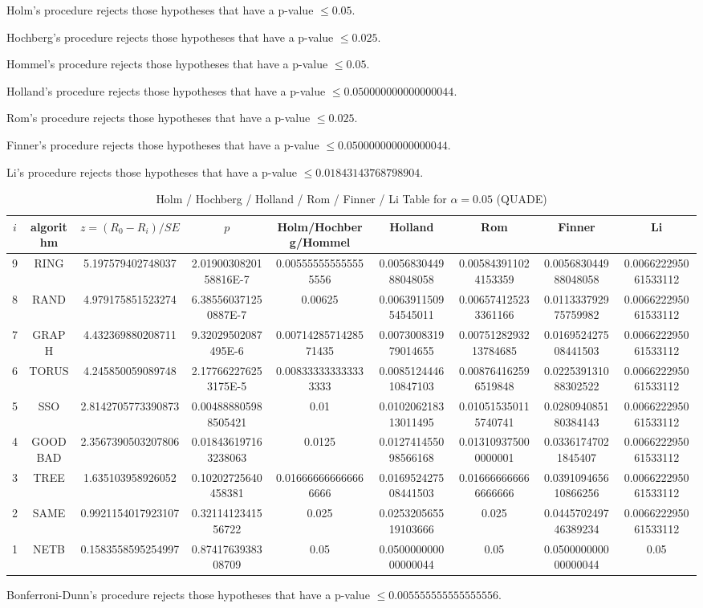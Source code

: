 \documentclass[a4paper,10pt]{article}
\begin{document}
\begin{landscape}
Holm's procedure rejects those hypotheses that have a p-value $\le0.05$.


Hochberg's procedure rejects those hypotheses that have a p-value $\le0.025$.


Hommel's procedure rejects those hypotheses that have a p-value $\le0.05$.


Holland's procedure rejects those hypotheses that have a p-value $\le0.050000000000000044$.


Rom's procedure rejects those hypotheses that have a p-value $\le0.025$.


Finner's procedure rejects those hypotheses that have a p-value $\le0.050000000000000044$.


Li's procedure rejects those hypotheses that have a p-value $\le0.01843143768798904$.



\newpage

\begin{table}[!htp]
\centering\scriptsize
\caption{Holm / Hochberg / Holland / Rom / Finner / Li Table for $\alpha=0.05$ (QUADE)}
\begin{tabular}{ccccccccc}
$i$&algorithm&$z=(R_0 - R_i)/SE$&$p$&Holm/Hochberg/Hommel&Holland&Rom&Finner&Li\\
\hline
9& RING&5.197579402748037&2.0190030820158816E-7&0.005555555555555556&0.005683044988048058&0.005843911024153359&0.005683044988048058&0.006622295061533112\\
8& RAND&4.979175851523274&6.385560371250887E-7&0.00625&0.006391150954545011&0.006574125233361166&0.011333792975759982&0.006622295061533112\\
7& GRAPH&4.432369880208711&9.32029502087495E-6&0.0071428571428571435&0.007300831979014655&0.0075128293213784685&0.016952427508441503&0.006622295061533112\\
6& TORUS&4.245850059089748&2.177662276253175E-5&0.008333333333333333&0.008512444610847103&0.008764162596519848&0.022539131088302522&0.006622295061533112\\
5& SSO&2.8142705773390873&0.004888805988505421&0.01&0.010206218313011495&0.010515350115740741&0.028094085180384143&0.006622295061533112\\
4& GOODBAD&2.3567390503207806&0.018436197163238063&0.0125&0.012741455098566168&0.013109375000000001&0.03361747021845407&0.006622295061533112\\
3& TREE&1.635103958926052&0.10202725640458381&0.016666666666666666&0.016952427508441503&0.016666666666666666&0.039109465610866256&0.006622295061533112\\
2& SAME&0.9921154017923107&0.3211412341556722&0.025&0.025320565519103666&0.025&0.044570249746389234&0.006622295061533112\\
1& NETB&0.1583558595254997&0.8741763938308709&0.05&0.050000000000000044&0.05&0.050000000000000044&0.05\\
\hline
\end{tabular}
\end{table}
Bonferroni-Dunn's procedure rejects those hypotheses that have a p-value $\le0.005555555555555556$.



\end{landscape}
\end{document}
